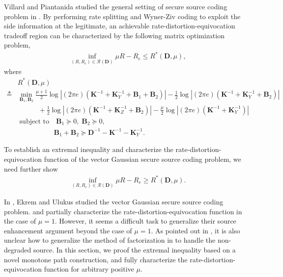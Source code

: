 \documentclass[journal,final, onecolumn]{IEEEtran}
\begin{document}
Villard and Piantanida studied the general setting of secure source coding problem in \cite{Villard13}. By performing rate splitting and Wyner-Ziv coding to exploit the side information at the legitimate, an achievable rate-distortion-equivocation tradeoff region can be characterized by the following matrix optimization problem,
\begin{align}
\inf_{(R, R_{e} )\in \mathcal{R}({\boldsymbol{D}})} \mu R-R_{e} \leq R^{*}({\boldsymbol{D}}, \mu),
\end{align}
where
\begin{align} \label{eqn:opt}
& R^{*}({\boldsymbol{D}}, \mu) \nonumber \\
\triangleq &\min_{\boldsymbol{B}_{1},\boldsymbol{B}_{2}}\frac{\mu+1}{2} \log \left| (2\pi e)\left( \boldsymbol{K}^{-1} + \boldsymbol{K}^{-1}_{Y} + \boldsymbol{B}_{1}+\boldsymbol{B}_{2}\right) \right|-\frac{1}{2} \log \left|(2 \pi e)\left(\boldsymbol{K}^{-1} + \boldsymbol{K}^{-1}_{Y} +\boldsymbol{B}_{2}\right) \right| \nonumber \\
&\qquad\quad +\frac{1}{2} \log \left|(2 \pi e)\left(\boldsymbol{K}^{-1} + \boldsymbol{K}^{-1}_{Z} +\boldsymbol{B}_{2}\right) \right| - \frac{\mu}{2} \log \left| (2 \pi e) \left(\boldsymbol{K}^{-1} + \boldsymbol{K}^{-1}_{Y} \right) \right| \nonumber \\
&\;\text{subject to}\quad \boldsymbol{B}_{1} \succeq {0}, \; \boldsymbol{B}_{2} \succeq {0},  \nonumber \\
& \qquad \qquad \quad \;\boldsymbol{B}_{1}+\boldsymbol{B}_{2} \succeq \boldsymbol{D}^{-1} -\boldsymbol{K}^{-1} - \boldsymbol{K}^{-1}_{Y}.
\end{align}

To establish an extremal inequality and characterize the rate-distortion-equivocation function of the vector Gaussian secure source coding problem, we need further show
\begin{align}
\inf_{(R, R_{e} )\in \mathcal{R}({\boldsymbol{D}})} \mu R-R_{e} \geq R^{*}({\boldsymbol{D}}, \mu).
\end{align}

In \cite{EU13}, Ekrem and Ulukus studied the vector Gaussian secure source coding problem. and partially characterize the rate-distortion-equivocation function in the case of $\mu=1$. However, it seems a difficult task to generalize their source enhancement argument beyond the case of $\mu=1$. As pointed out in \cite{XC21}, it is also unclear how to generalize the method of factorization in \cite{GN14} to handle the non-degraded source. In this section, we proof the extremal inequality based on a novel monotone path construction, and fully characterize the rate-distortion-equivocation function for arbitrary positive $\mu$.
\end{document}
